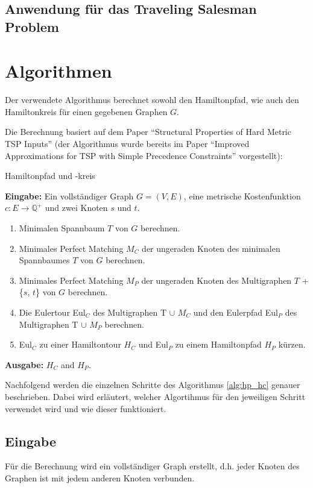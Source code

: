 \documentclass[11pt,a4paper]{article}
\begin{document}
\subsection{Anwendung für das Traveling Salesman Problem}
\newpage
\section{Algorithmen}
Der verwendete Algorithmus berechnet sowohl den Hamiltonpfad, wie auch den Hamiltonkreis für einen gegebenen Graphen $G$. 

Die Berechnung basiert auf dem Paper "`Structural Properties of Hard Metric TSP Inputs"'\cite{moemke11} (der Algorithmus wurde bereits im Paper "`Improved Approximations for TSP with Simple Precedence Constraints"'\cite{boeckenhauer10} vorgestellt):

\begin{algorithm}
    \caption{Hamiltonpfad und -kreis \cite{moemke11}}
    \label{alg:hp_hc}
\textbf{Eingabe:} Ein vollständiger Graph $G = (V,E)$, eine metrische Kostenfunktion $c: E \rightarrow \mathbb{Q}^+$ und zwei Knoten $s$ und $t$.
    \begin{enumerate}
        \item Minimalen Spannbaum $T$ von $G$ berechnen.
        \item Minimales Perfect Matching $M_C$ der ungeraden Knoten des minimalen Spannbaumes $T$ von $G$ berechnen.
        \item Minimales Perfect Matching $M_P$ der ungeraden Knoten des Multigraphen $T$ + \{$s$, $t$\} von $G$ berechnen.
        \item Die Eulertour Eul$_C$ des Multigraphen T $\cup$ $M_C$ und den Eulerpfad Eul$_P$ des Multigraphen T $\cup$ $M_P$ berechnen.
        \item Eul$_C$ zu einer Hamiltontour $H_C$ und Eul$_P$ zu einem Hamiltonpfad $H_P$ kürzen.
    \end{enumerate}
\textbf{Ausgabe:} $H_C$ and $H_P$.

\end{algorithm}

Nachfolgend werden die einzelnen Schritte des Algorithmus \ref{alg:hp_hc} genauer beschrieben. Dabei wird erläutert, welcher Algortihmus für den jeweiligen Schritt verwendet wird und wie dieser funktioniert.

\subsection{Eingabe}
Für die Berechnung wird ein vollständiger Graph erstellt, d.h. jeder Knoten des Graphen ist mit jedem anderen Knoten verbunden.
\end{document}
